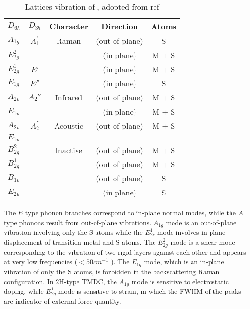 \begin{table}[htb]
\centering
\caption{Lattices vibration of , adopted from ref\cite{Molina-Sanchez2011}}\label{tab:tmslattice}
\begin{tabular}{lcccc}
\toprule
 $D_{6h}$   & $D_{3h}$ & Character &  Direction & Atoms  \\
\midrule
$A_{1g}$    &  $A_1^{'}$   & Raman     & (out of plane)  & S  \\
$E_{2g}^2$  &          &           & (in plane)      & M + S  \\
$E_{2g}^1$  &  $E'$    &           & (in plane)      & M + S  \\
$E_{1g}$    &  $E''$    &           & (in plane)      & S  \\
\midrule
$A_{2u}$    &  $A_2''$  & Infrared  & (out of plane)  & M + S  \\
$E_{1u}$    &          &           & (in plane)      & M + S  \\
\midrule
$A_{2u}$    &  $A_2^{''}$   & Acoustic  & (out of plane)  & M + S  \\
$E_{1u}$    &          &           &       &    \\
\midrule
$B_{2g}^2$  &          & Inactive  & (out of plane)  & M + S  \\
$B_{2g}^1$  &          &           & (out of plane)  & M + S  \\
$B_{1u}$    &          &           & (out of plane)  & S  \\
$E_{2u}$    &          &           & (in plane)      & S  \\
\bottomrule
\end{tabular}
\end{table}

The $E$ type phonon branches correspond to in-plane normal modes, while the $A$ type phonons result from out-of-plane vibrations. $A_{1g}$ mode is an out-of-plane vibration involving only the S atoms while the $E_{2g}^1$ mode involves in-plane displacement of transition metal and S atoms. The $E_{2g}^2$ mode is a shear mode corresponding to the vibration of two rigid layers against
each other and appears at very low frequencies ($<50 cm^{-1}$ \cite{Zhang2013i}). The $E_{1g}$ mode, which is an in-plane vibration of only the S atoms, is forbidden in the backscattering Raman configuration. In 2H-type TMDC, the $A_{1g}$ mode is sensitive to electrostatic doping, while $E_{2g}^1$ mode is sensitive to strain, in which the FWHM of the peaks are indicator of external force quantity.\cite{Zhao2013}

